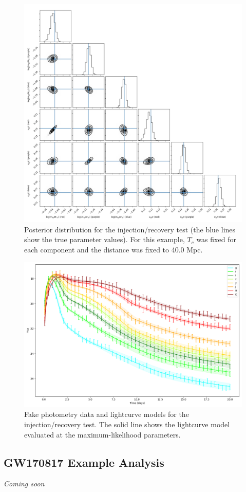 \documentclass{article}
\begin{document}
\begin{figure}[!ht]
    \centering
    \includegraphics[width=6.5in]{corner.png}
    \caption{Posterior distribution for the injection/recovery test (the blue lines show the true parameter values). For this example, $T_c$ was fixed for each component and the distance was fixed to 40.0 Mpc.}
    \label{fig:corner}
\end{figure}

\begin{figure}[!ht]
    \centering
    \includegraphics[width=6.5in]{lc.png}
    \caption{Fake photometry data and lightcurve models for the injection/recovery test. The solid line shows the lightcurve model evaluated at the maximum-likelihood parameters.}
    \label{fig:lightcurves}
\end{figure}

\subsection{GW170817 Example Analysis}

\textit{Coming soon}

\clearpage



\end{document}
